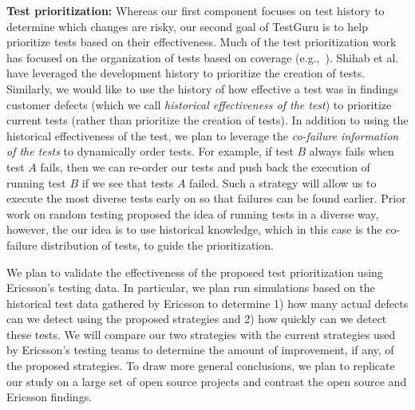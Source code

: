 \textbf{Test prioritization:} Whereas our first component focuses on test history to determine which changes are risky, our second goal of TestGuru is to help prioritize tests based on their effectiveness. Much of the test prioritization work has focused on the organization of tests based on coverage (e.g.,~\cite{AggrawalSEN04}).  Shihab et al. have leveraged the development history to prioritize the creation of tests. Similarly, we would like to use the history of how effective a test was in findings customer defects (which we call \emph{historical effectiveness of the test}) to prioritize current tests (rather than prioritize the creation of tests). In addition to using the historical effectiveness of the test, we plan to leverage the \emph{co-failure information of the tests} to dynamically order tests. For example, if test $B$ always fails when test $A$ fails, then we can re-order our tests and push back the execution of running test $B$ if we see that tests $A$ failed. Such a strategy will allow us to execute the most diverse tests early on so that failures can be found earlier. Prior work on random testing \cite{Duran84TSE, Arcuri2012TSE} proposed the idea of running tests in a diverse way, however, the our idea is to use historical knowledge, which in this case is the co-failure distribution of tests, to guide the prioritization. 

We plan to validate the effectiveness of the proposed test prioritization using Ericsson's testing data. In particular, we plan run simulations based on the historical test data gathered by Ericsson to determine 1) how many actual defects can we detect using the proposed strategies and 2) how quickly can we detect these tests. We will compare our two strategies with the current strategies used by Ericsson's testing teams to determine the amount of improvement, if any, of the proposed strategies. To draw more general conclusions, we plan to replicate our study on a large set of open source projects and contrast the open source and Ericsson findings.


